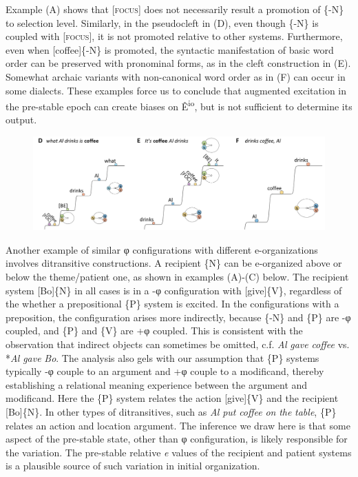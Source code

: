   Example (A) shows that [\textsc{focus}] does not necessarily result a promotion of \{-N\} to selection level. Similarly, in the pseudocleft in (D), even though \{-N\} is coupled with [\textsc{focus}], it is not promoted relative to other systems. Furthermore, even when [coffee]\{-N\} is promoted, the syntactic manifestation of basic word order can be preserved with pronominal forms, as in the cleft construction in (E). Somewhat archaic variants with non-canonical word order as in (F) can occur in some dialects. These examples force us to conclude that augmented excitation in the pre-stable epoch can create biases on Ê\textsuperscript{io}, but is not sufficient to determine its output. 

  
\begin{figure}
\includegraphics[width=\textwidth]{figures/Tilsen-img79.png}
\caption{\missingcaption}
\label{fig:}
\end{figure}
 

  Another example of similar φ configurations with different e-organizations involves ditransitive constructions. A recipient \{N\} can be e-organized above or below the theme/patient one, as shown in examples (A)-(C) below. The recipient system [Bo]\{N\} in all cases is in a -φ configuration with [give]\{V\}, regardless of the whether a prepositional \{P\} system is excited. In the configurations with a preposition, the configuration arises more indirectly, because \{-N\} and \{P\} are -φ coupled, and \{P\} and \{V\} are +φ coupled. This is consistent with the observation that indirect objects can sometimes be omitted, c.f. \textit{Al} \textit{gave} \textit{coffee} vs. *\textit{Al} \textit{gave} \textit{Bo}. The analysis also gels with our assumption that \{P\} systems typically -φ couple to an argument and +φ couple to a modificand, thereby establishing a relational meaning experience between the argument and modificand. Here the \{P\} system relates the action [give]\{V\} and the recipient [Bo]\{N\}. In other types of ditransitives, such as \textit{Al} \textit{put} \textit{coffee} \textit{on} \textit{the} \textit{table}, \{P\} relates an action and location argument. The inference we draw here is that some aspect of the pre-stable state, other than φ configuration, is likely responsible for the variation. The pre-stable relative \textit{e} values of the recipient and patient systems is a plausible source of such variation in initial organization.

